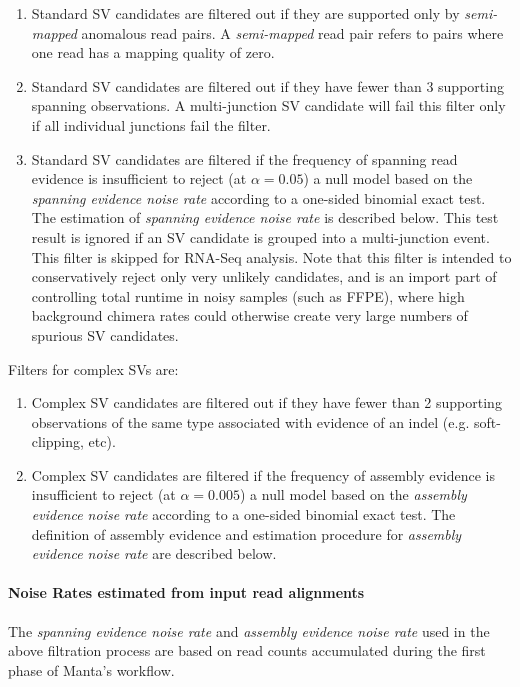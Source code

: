 \documentclass{article}
\begin{document}
\begin{enumerate}
    \item Standard SV candidates are filtered out if they are supported only by \textit{semi-mapped} anomalous read pairs. A \textit{semi-mapped} read pair refers to pairs where one read has a mapping quality of zero.
    \item Standard SV candidates are filtered out if they have fewer than 3 supporting spanning observations. A multi-junction SV candidate will fail this filter only if all individual junctions fail the filter.
    \item Standard SV candidates are filtered if the frequency of spanning read evidence is insufficient to reject (at $\alpha = 0.05$) a null model based on the \textit{spanning evidence noise rate} according to a one-sided binomial exact test. The estimation of \textit{spanning evidence noise rate} is described below. This test result is ignored if an SV candidate is grouped into a multi-junction event. This filter is skipped for RNA-Seq analysis. Note that this filter is intended to conservatively reject only very unlikely candidates, and is an import part of controlling total runtime in noisy samples (such as FFPE), where high background chimera rates could otherwise create very large numbers of spurious SV candidates.
\end{enumerate}

Filters for complex SVs are:

\begin{enumerate}
    \item Complex SV candidates are filtered out if they have fewer than 2 supporting observations of the same type associated with evidence of an indel (e.g. soft-clipping, etc).
    \item Complex SV candidates are filtered if the frequency of assembly evidence is insufficient to reject (at $\alpha = 0.005$) a null model based on the \textit{assembly evidence noise rate} according to a one-sided binomial exact test. The definition of assembly evidence and estimation procedure for \textit{assembly evidence noise rate} are described below.
\end{enumerate}

\paragraph{Noise Rates estimated from input read alignments}

The \textit{spanning evidence noise rate} and \textit{assembly evidence noise rate} used in the above filtration process are based on read counts accumulated during the first phase of Manta's workflow.
\end{document}
